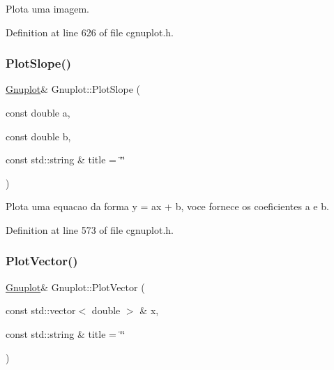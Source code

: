 Plota uma imagem. 



Definition at line 626 of file cgnuplot.\+h.

\mbox{\label{class_gnuplot_af4c2215781aa7a32ba73caa26941407c}} 
\subsubsection{\texorpdfstring{Plot\+Slope()}{PlotSlope()}}
{\footnotesize\ttfamily \hyperlink{class_gnuplot}{Gnuplot}\& Gnuplot\+::\+Plot\+Slope (\begin{DoxyParamCaption}\item[{const double}]{a,  }\item[{const double}]{b,  }\item[{const std\+::string \&}]{title = {\ttfamily \char`\"{}\char`\"{}} }\end{DoxyParamCaption})\hspace{0.3cm}{\ttfamily [inline]}}



Plota uma equacao da forma y = ax + b, voce fornece os coeficientes a e b. 



Definition at line 573 of file cgnuplot.\+h.

\mbox{\label{class_gnuplot_ab478d91039848a22733fc7a0f7c25f04}} 
\subsubsection{\texorpdfstring{Plot\+Vector()}{PlotVector()}\hspace{0.1cm}{\footnotesize\ttfamily [1/3]}}
{\footnotesize\ttfamily \hyperlink{class_gnuplot}{Gnuplot}\& Gnuplot\+::\+Plot\+Vector (\begin{DoxyParamCaption}\item[{const std\+::vector$<$ double $>$ \&}]{x,  }\item[{const std\+::string \&}]{title = {\ttfamily \char`\"{}\char`\"{}} }\end{DoxyParamCaption})\hspace{0.3cm}{\ttfamily [inline]}}



